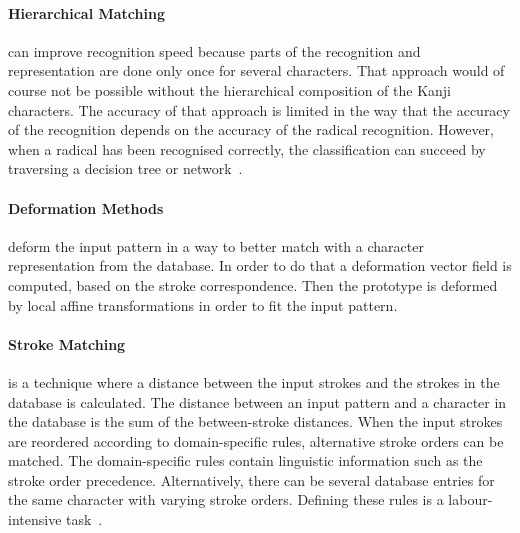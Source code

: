 \paragraph{Hierarchical Matching} can improve recognition speed because parts 
of the recognition and representation are done only once for several characters.
That approach would of course not be possible without the hierarchical 
composition of the Kanji characters. The accuracy of that approach is limited in
the way that the accuracy of the recognition depends on the accuracy of the
radical recognition. However, when a radical has been recognised correctly, 
the classification can succeed by traversing a decision tree or 
network~.

\paragraph{Deformation Methods} deform the input pattern in a way to better match
with a character representation from the database. In order to do that a 
deformation vector field is computed, based on the stroke correspondence.
Then the prototype is deformed by local affine transformations in order to fit 
the input pattern.

\paragraph{Stroke Matching} is a technique where a distance between the input 
strokes and the strokes in the database is calculated. The distance between an
input pattern and a character in the database is the sum of the between-stroke
distances. When the input strokes are reordered according to domain-specific 
rules, alternative stroke orders can be matched. The domain-specific rules 
contain linguistic information such as the stroke order precedence.
Alternatively, there can be several database entries for the same character with
varying stroke orders. Defining these rules is a labour-intensive 
task~.

